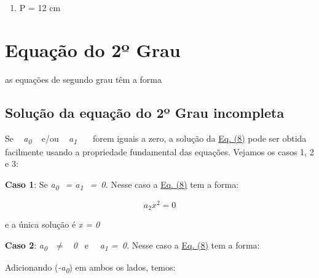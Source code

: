 \begin{exercicios}
\begin{enumerate}
	\item P = 12 cm
\end{enumerate}



\end{exercicios}

\section{Equação do 2º Grau}

\begin{caixa}
\begin{tdefinicao}
as equações de segundo grau têm a forma
\end{tdefinicao}
\end{caixa}

\subsection{Solução da equação do 2º Grau incompleta}

Se ~ \textit{a\textsubscript{0}} ~ e/ou ~ \textit{a\textsubscript{1}}~~~ forem iguais a zero, a solução da \hyperref[eqc:4.8]{Eq. (8)} pode ser obtida facilmente usando a propriedade fundamental das equações. Vejamos os casos 1, 2 e 3:

\textbf{Caso 1}: Se \textit{a\textsubscript{0~ }= a\textsubscript{1~ }=~0. }Nesse caso a \hyperref[eqc:4.8]{Eq. (8)} tem a forma:

 \[ a_{2}x^{2}=0 \]

e a única solução é \textit{x = 0} \qedsymbol{}

\textbf{Caso 2}:  \textit{a\textsubscript{0~ }$ \neq $ ~0~  }e~~ \textit{a\textsubscript{1 }=~0. }Nesse caso a \hyperref[eqc:4.8]{Eq. (8)} tem a forma:


Adicionando (\textit{-a\textsubscript{0}}) em ambos os lados, temos:

